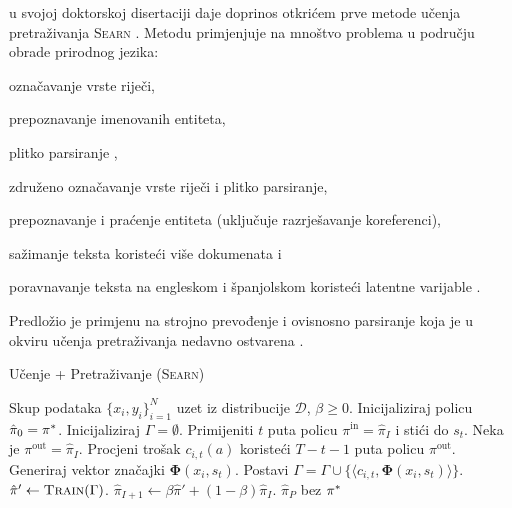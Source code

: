 \citet{daume06thesis} u svojoj doktorskoj disertaciji daje doprinos otkrićem
prve metode učenja pretraživanja \textsc{Searn} .
Metodu primjenjuje na mnoštvo problema u području obrade prirodnog jezika:
\begin{inlinelist}
  \item označavanje vrste riječi,
  \item prepoznavanje imenovanih entiteta,
  \item plitko parsiranje ,
  \item združeno označavanje vrste riječi i plitko parsiranje,
  \item prepoznavanje i praćenje entiteta (uključuje razrješavanje koreferenci),
  \item sažimanje teksta koristeći više dokumenata i
  \item poravnavanje teksta na engleskom i španjolskom koristeći latentne
  varijable .
\end{inlinelist}
Predložio je primjenu na strojno prevođenje i ovisnosno parsiranje koja je u
okviru učenja pretraživanja nedavno ostvarena
\citep{he2015syntax,chang2015learning}.

\begin{algorithm}
\caption{Učenje + Pretraživanje (\textsc{Searn})}\label{alg:searn}
\begin{algorithmic}[1]
\Require Skup podataka $\{x_i, y_i\}_{i=1}^N$ uzet iz distribucije $\mathcal{D}$,
  $\beta \geq 0$. %
\State Inicijaliziraj policu $\hat{\pi}_0 = \pi\ssymbol{1}$.
\ForAll{$I \in \big[0,1,2,\ldots,P)$}
    \State Inicijaliziraj $\Gamma = \emptyset$. 
      \State Primijeniti $t$ puta policu $\pi^{\text{in}} = \hat{\pi}_{I}$  i stići do $s_t$. 
      \label{alg:searn:action}
        \State Neka je  $\pi^{\text{out}} = \hat{\pi}_{I}$.\label{alg:searn:rolloutpolicy}
        \State Procjeni trošak $c_{i,t}(a)$ koristeći $T-t-1$ puta policu $\pi^{\text{out}}$. \label{alg:searn:rollout}
      \EndFor
      \State Generiraj vektor značajki $\mathbf{\Phi}(x_i, s_t)$.
      \State Postavi $\Gamma = \Gamma \cup \{\langle c_{i,t}, \mathbf{\Phi}(x_i, s_t) \rangle\}$.
    \EndFor
  \EndFor
  \State $\hat{\pi}' \gets \textsc{Train}(\Gamma)$.
  \State $\hat{\pi}_{I+1} \gets \beta \hat{\pi}' + (1-\beta) \hat{\pi}_{I}$. \label{alg:searn:mixture}
\EndFor
\State \Return $\hat{\pi}_{P}$ bez $\pi\ssymbol{1}$
\end{algorithmic}
\end{algorithm}

